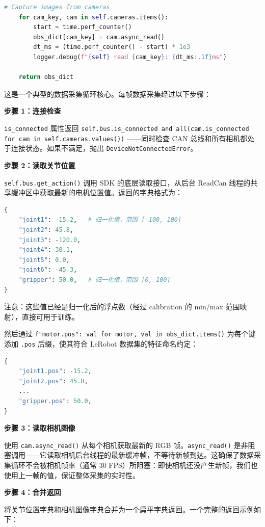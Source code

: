 \documentclass[UTF8,a4paper,11pt]{ctexart}
\begin{document}
{\begin{lstlisting}[language=python]
    # Capture images from cameras
    for cam_key, cam in self.cameras.items():
        start = time.perf_counter()
        obs_dict[cam_key] = cam.async_read()
        dt_ms = (time.perf_counter() - start) * 1e3
        logger.debug(f"{self} read {cam_key}: {dt_ms:.1f}ms")

    return obs_dict
\end{lstlisting}

这是一个典型的数据采集循环核心。每帧数据采集经过以下步骤：

\textbf{步骤 1：连接检查}

\texttt{is_connected} 属性返回 \texttt{self.bus.is_connected and all(cam.is_connected for cam in self.cameras.values())} ——同时检查 CAN 总线和所有相机都处于连接状态。如果不满足，抛出 \texttt{DeviceNotConnectedError}。

\textbf{步骤 2：读取关节位置}

\texttt{self.bus.get_action()} 调用 SDK 的底层读取接口，从后台 ReadCan 线程的共享缓冲区中获取最新的电机位置值。返回的字典格式为：

\begin{lstlisting}[language=python]
{
    "joint1": -15.2,   # 归一化值，范围 [-100, 100]
    "joint2": 45.8,
    "joint3": -120.0,
    "joint4": 30.1,
    "joint5": 0.0,
    "joint6": -45.3,
    "gripper": 50.0,   # 归一化值，范围 [0, 100]
}
\end{lstlisting}

注意：这些值已经是归一化后的浮点数（经过 calibration 的 min/max 范围映射），直接可用于训练。

然后通过 \texttt{{f"{motor}.pos": val for motor, val in obs_dict.items()}} 为每个键添加 \texttt{.pos} 后缀，使其符合 LeRobot 数据集的特征命名约定：

\begin{lstlisting}[language=python]
{
    "joint1.pos": -15.2,
    "joint2.pos": 45.8,
    ...
    "gripper.pos": 50.0,
}
\end{lstlisting}

\textbf{步骤 3：读取相机图像}

使用 \texttt{cam.async_read()} 从每个相机获取最新的 RGB 帧。\texttt{async_read()} 是非阻塞调用——它读取相机后台线程的最新缓冲帧，不等待新帧到达。这确保了数据采集循环不会被相机帧率（通常 30 FPS）所阻塞：即使相机还没产生新帧，我们也使用上一帧的值，保证整体采集的实时性。

\textbf{步骤 4：合并返回}

将关节位置字典和相机图像字典合并为一个扁平字典返回。一个完整的返回示例如下：

}
\end{document}
